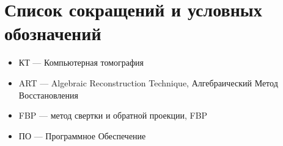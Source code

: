 \chapter*{Список сокращений и условных обозначений}
\begin{itemize}
\item КТ --- Компьютерная томография
\item ART --- Algebraic Reconstruction Technique, Алгебраический Метод Восстановления
\item FBP --- метод свертки и обратной проекции, FBP
\item ПО --- Программное Обеспечение
\end{itemize}